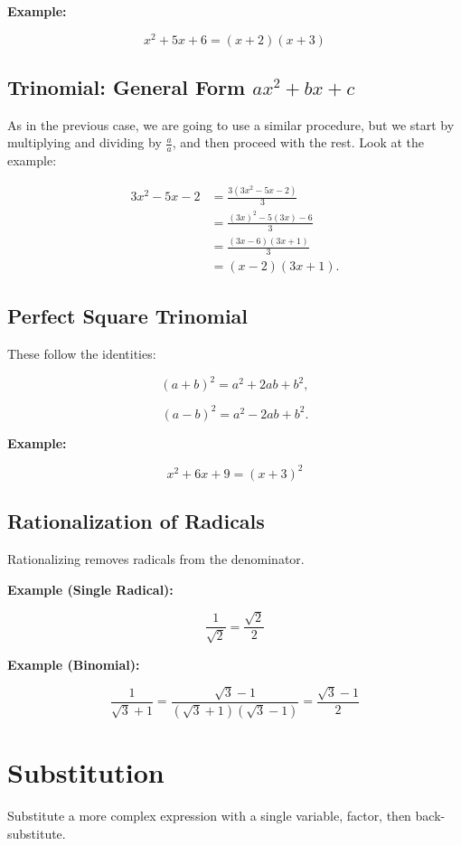 \textbf{Example:}

\[
    x^2 + 5x + 6 = (x + 2)(x + 3)
\]

\subsection{Trinomial: General Form \texorpdfstring{\(ax^2 + bx + c\)}{ax² + bx + c}}

As in the previous case, we are going to use a similar procedure, but we start by multiplying and dividing by \(\frac{a}{a}\), and then proceed with the rest. Look at the example:

\begin{align*}
3x^2 -5x - 2 &= \frac{3(3x^2 -5x - 2)}{3} \\
             &= \frac{{(3x)}^2 -5(3x) - 6}{3}\\ 
             &= \frac{(3x- 6)(3x+1)}{3} \\
             &= (x- 2)(3x +1).
\end{align*}

\subsection{Perfect Square Trinomial}

These follow the identities:

\[
    (a + b)^2 = a^2 + 2ab + b^2,
\]

\[
    (a - b)^2 = a^2 - 2ab + b^2.
\]

\textbf{Example:}

\[
    x^2 + 6x + 9 = {(x + 3)}^2
\]

\subsection{Rationalization of Radicals}

Rationalizing removes radicals from the denominator.

\textbf{Example (Single Radical):}

\[
    \frac{1}{\sqrt{2}} = \frac{\sqrt{2}}{2}
\]

\textbf{Example (Binomial):}

\[
    \frac{1}{\sqrt{3} + 1} = \frac{\sqrt{3} - 1}{(\sqrt{3} + 1)(\sqrt{3} - 1)} = \frac{\sqrt{3} - 1}{2}
\]
\section{Substitution}

Substitute a more complex expression with a single variable, factor, then back-substitute.


